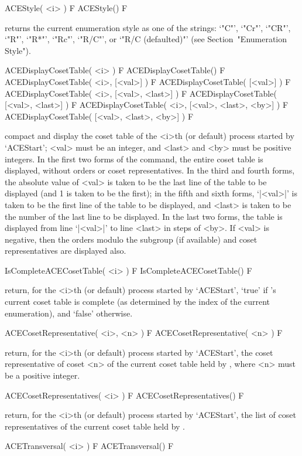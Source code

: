 \>ACEStyle( <i> ) F
\>ACEStyle() F

returns the current enumeration style as one of  the  strings:  `"C"',
`"Cr"', `"CR"', `"R"', `"R*"', `"Rc"', `"R/C"', or `"R/C (defaulted)"'
(see Section~"Enumeration Style").

\>ACEDisplayCosetTable( <i> ) F
\>ACEDisplayCosetTable() F
\>ACEDisplayCosetTable( <i>, [<val>] ) F
\>ACEDisplayCosetTable( [<val>] ) F
\>ACEDisplayCosetTable( <i>, [<val>, <last>] ) F
\>ACEDisplayCosetTable( [<val>, <last>] ) F
\>ACEDisplayCosetTable( <i>, [<val>, <last>, <by>] ) F
\>ACEDisplayCosetTable( [<val>, <last>, <by>] ) F

compact and display the coset table of the <i>th (or default)  process
started by `ACEStart'; <val> must be an integer, and <last>  and  <by>
must be positive integers. In the first two forms of the command,  the
entire  coset  table   is   displayed,   without   orders   or   coset
representatives. In the third and fourth forms, the absolute value  of
<val> is taken to be the last line of the table to be displayed (and 1
is taken to be the first); in the fifth and sixth forms, `|<val>|'  is
taken to be the first line of the table to be displayed, and <last> is
taken to be the number of the last line to be displayed. In  the  last
two forms, the table is displayed from line `|<val>|' to  line  <last>
in steps of <by>. If <val> is negative, then  the  orders  modulo  the
subgroup (if available) and coset representatives are displayed also.

\>IsCompleteACECosetTable( <i> ) F
\>IsCompleteACECosetTable() F

return, for the <i>th (or  default)  process  started  by  `ACEStart',
`true' if {\ACE}'s current coset table is complete (as  determined  by
the index of the current enumeration), and `false' otherwise.

\>ACECosetRepresentative( <i>, <n> ) F
\>ACECosetRepresentative( <n> ) F

return, for the <i>th (or default) process started by `ACEStart',  the
coset representative of coset <n> of the current coset table  held  by
{\ACE}, where <n> must be a positive integer.

\>ACECosetRepresentatives( <i> ) F
\>ACECosetRepresentatives() F

return, for the <i>th (or default) process started by `ACEStart',  the
list of coset representatives of  the  current  coset  table  held  by
{\ACE}.

\>ACETransversal( <i> ) F
\>ACETransversal() F

